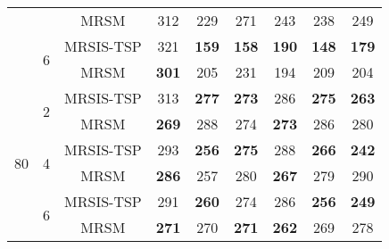 \begin{table}[h]
{\begin{tabular}{ccccccccc}
   &  & MRSM & 312 & 229 & 271 & 243 & 238 & 249 \\ \cline{2-9}
   & \multirow{2}{*}{6} & MRSIS-TSP & 321 & \textbf{159} & \textbf{158} & \textbf{190} & \textbf{148} & \textbf{179} \\
   &  & MRSM & \textbf{301} & 205 & 231 & 194 & 209 & 204 \\ \hline
  \multirow{6}{*}{80} & \multirow{2}{*}{2} & MRSIS-TSP & 313 & \textbf{277} & \textbf{273} & 286 & \textbf{275} & \textbf{263} \\
   &  & MRSM & \textbf{269} & 288 & 274 & \textbf{273} & 286 & 280 \\ \cline{2-9}
   & \multirow{2}{*}{4} & MRSIS-TSP & 293 & \textbf{256} & \textbf{275} & 288 & \textbf{266} & \textbf{242} \\
   &  & MRSM & \textbf{286} & 257 & 280 & \textbf{267} & 279 & 290 \\ \cline{2-9}
   & \multirow{2}{*}{6} & MRSIS-TSP & 291 & \textbf{260} & 274 & 286 & \textbf{256} & \textbf{249} \\
   &  & MRSM & \textbf{271} & 270 & \textbf{271} & \textbf{262} & 269 & 278 \\ \hline
  \end{tabular} }
  \end{table}


